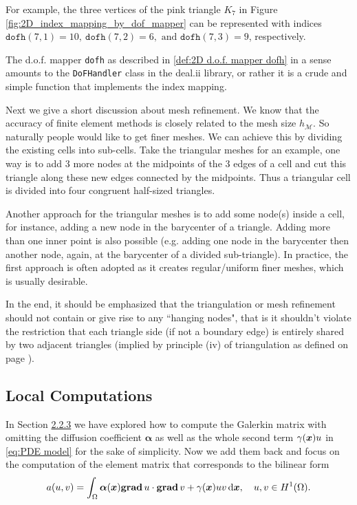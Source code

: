 	\vspace{3pt}
	For example, the three vertices of the pink triangle $K_7$ in Figure 
	\ref{fig:2D_index_mapping_by_dof_mapper} can be represented with indices
	$\texttt{dofh}(7,1)=10,\ \texttt{dofh}(7,2)=6, \textrm{ and } 
	\texttt{dofh}(7,3)=9$, respectively.
	
	The d.o.f. mapper \texttt{dofh} as described in
	\eqref{def:2D d.o.f. mapper dofh} in a sense amounts to the 
	\texttt{DoFHandler} class in the deal.ii library, or rather it is a crude 
	and simple function that implements the index mapping.\vspace{5pt}
	
	Next we give a short discussion about mesh refinement. We know that the 
	accuracy of finite element methods is closely related to the mesh size
	$h_\mathcal{M}$. So naturally people would like to get finer meshes. We
	can achieve this by dividing the existing cells into sub-cells. Take the 
	triangular meshes for an example, one way is to add 3 more nodes at the 
	midpoints of the 3 edges of a cell and cut this triangle along these new 
	edges connected by the midpoints. Thus a triangular cell is divided into
	four congruent half-sized triangles.
	\begin{figure}[!htbp]
		\centering
		
	\end{figure}
	
	Another approach for the triangular meshes is to add some node(s) inside 
	a cell, for instance, adding a new node in the barycenter of a triangle.
	Adding more than one inner point is also possible (e.g. adding one node
	in the barycenter then another node, again, at the barycenter of a divided 
	sub-triangle). In practice, the first approach is often adopted as it 
	creates regular/uniform finer meshes, which is usually desirable.	
	\begin{figure}[!htbp]
		\centering
		
	\end{figure}
	
	In the end, it should be emphasized that the triangulation or mesh 
	refinement should not contain or give rise to any ``hanging nodes", that 
	is it shouldn't violate the restriction that each triangle side (if not a 
	boundary edge) is entirely shared by two adjacent triangles (implied by 
	principle (iv) of triangulation as defined on page 
	\pageref{def:triangulation}).
		
	\subsection{Local Computations}\label{subsection.4.2}
	In Section \hyperref[subsubsection.2.2.3]{2.2.3} we have explored how to 
	compute the Galerkin matrix with omitting the diffusion coefficient 
	$\bm{\alpha}$ as well as the whole second term $\gamma(\bm{x})u$ in 
	\eqref{eq:PDE model} for the sake of simplicity. Now we add them back and 
	focus on the computation of the element matrix that corresponds to the 
	bilinear form 
	\[a(u,v)=\int_{\Omega}\bm{\alpha}(\bm{x})\mathbf{grad}\, u\cdot \mathbf{grad}\, v 
		+ \gamma(\bm{x}) uv \,\mathrm{d}\bm{x},	\quad u,v\in H^1(\Omega). \]
	

